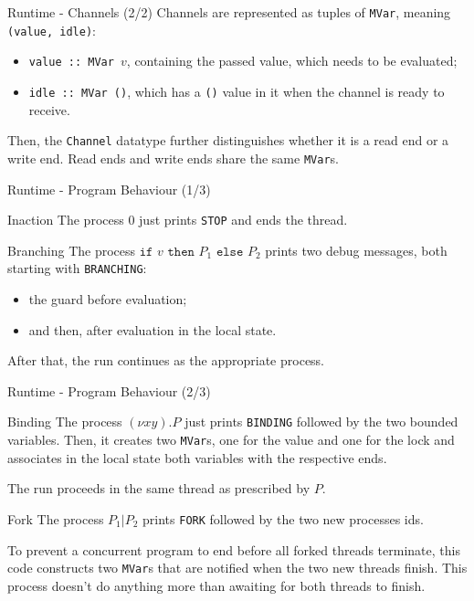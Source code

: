 \begin{frame}{Runtime - Channels (2/2)}
    Channels are represented as tuples of \texttt{MVar}, meaning \texttt{(value, idle)}:
    \begin{itemize}
        \item \texttt{value :: MVar }$v$, containing the passed value, which needs to be evaluated;
        \item \texttt{idle :: MVar ()}, which has a \texttt{()} value in it when the channel is ready to receive.
    \end{itemize}
    Then, the \texttt{Channel} datatype further distinguishes whether it is a read end or a write end. Read ends and write ends share the same \texttt{MVar}s.
\end{frame}

\begin{frame}{Runtime - Program Behaviour (1/3)}
    \begin{block}{Inaction}
        The process $0$ just prints \texttt{STOP} and ends the thread.
    \end{block}

    \begin{block}{Branching}
        The process $\texttt{if }v\texttt{ then }P_1\texttt{ else }P_2$ prints two debug messages, both starting with \texttt{BRANCHING}:
        \begin{itemize}
            \item the guard before evaluation;
            \item and then, after evaluation in the local state.
        \end{itemize}
        After that, the run continues as the appropriate process.
    \end{block}
\end{frame}

\begin{frame}{Runtime - Program Behaviour (2/3)}
    \begin{block}{Binding}
        The process $(\nu x y) . P$ just prints \texttt{BINDING} followed by the two bounded variables. Then, it creates two \texttt{MVar}s, one for the value and one for the lock and associates in the local state both variables with the respective ends.

        The run proceeds in the same thread as prescribed by $P$.
    \end{block}

    \begin{block}{Fork}
        The process $P_1 | P_2$ prints \texttt{FORK} followed by the two new processes ids.

        To prevent a concurrent program to end before all forked threads terminate, this code constructs two \texttt{MVar}s that are notified when the two new threads finish. This process doesn't do anything more than awaiting for both threads to finish.
    \end{block}
\end{frame}

